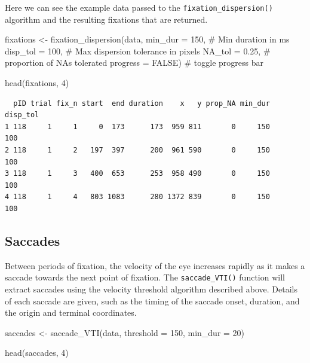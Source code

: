 \documentclass[
  man,
  floatsintext,
  longtable,
  nolmodern,
  notxfonts,
  notimes,
  colorlinks=true,linkcolor=blue,citecolor=blue,urlcolor=blue]{apa7}
\newenvironment{Shaded}{\begin{snugshade}}{\end{snugshade}}
\newcommand{\AttributeTok}[1]{\textcolor[rgb]{0.40,0.45,0.13}{#1}}
\newcommand{\CommentTok}[1]{\textcolor[rgb]{0.37,0.37,0.37}{#1}}
\newcommand{\ConstantTok}[1]{\textcolor[rgb]{0.56,0.35,0.01}{#1}}
\newcommand{\DecValTok}[1]{\textcolor[rgb]{0.68,0.00,0.00}{#1}}
\newcommand{\FloatTok}[1]{\textcolor[rgb]{0.68,0.00,0.00}{#1}}
\newcommand{\FunctionTok}[1]{\textcolor[rgb]{0.28,0.35,0.67}{#1}}
\newcommand{\NormalTok}[1]{\textcolor[rgb]{0.00,0.23,0.31}{#1}}
\newcommand{\OtherTok}[1]{\textcolor[rgb]{0.00,0.23,0.31}{#1}}
\begin{document}
Here we can see the example data passed to the
\texttt{fixation\_dispersion()} algorithm and the resulting fixations
that are returned.

\begin{Shaded}
\begin{Highlighting}[]
\NormalTok{fixations }\OtherTok{\textless{}{-}} 
  \FunctionTok{fixation\_dispersion}\NormalTok{(data,}
                      \AttributeTok{min\_dur =} \DecValTok{150}\NormalTok{, }\CommentTok{\# Min duration in ms}
                      \AttributeTok{disp\_tol =} \DecValTok{100}\NormalTok{, }\CommentTok{\# Max dispersion tolerance in pixels}
                      \AttributeTok{NA\_tol =} \FloatTok{0.25}\NormalTok{, }\CommentTok{\# proportion of NAs tolerated }
                      \AttributeTok{progress =} \ConstantTok{FALSE}\NormalTok{) }\CommentTok{\# toggle progress bar}
                   

\FunctionTok{head}\NormalTok{(fixations, }\DecValTok{4}\NormalTok{)}
\end{Highlighting}
\end{Shaded}

\begin{verbatim}
  pID trial fix_n start  end duration    x   y prop_NA min_dur disp_tol
1 118     1     1     0  173      173  959 811       0     150      100
2 118     1     2   197  397      200  961 590       0     150      100
3 118     1     3   400  653      253  958 490       0     150      100
4 118     1     4   803 1083      280 1372 839       0     150      100
\end{verbatim}

\subsection{Saccades}\label{saccades}

Between periods of fixation, the velocity of the eye increases rapidly
as it makes a saccade towards the next point of fixation. The
\texttt{saccade\_VTI()} function will extract saccades using the
velocity threshold algorithm described above. Details of each saccade
are given, such as the timing of the saccade onset, duration, and the
origin and terminal coordinates.

\begin{Shaded}
\begin{Highlighting}[]
\NormalTok{saccades }\OtherTok{\textless{}{-}} \FunctionTok{saccade\_VTI}\NormalTok{(data,}
                        \AttributeTok{threshold =} \DecValTok{150}\NormalTok{,}
                        \AttributeTok{min\_dur =} \DecValTok{20}\NormalTok{)}

\FunctionTok{head}\NormalTok{(saccades, }\DecValTok{4}\NormalTok{)}
\end{Highlighting}
\end{Shaded}
\end{document}
